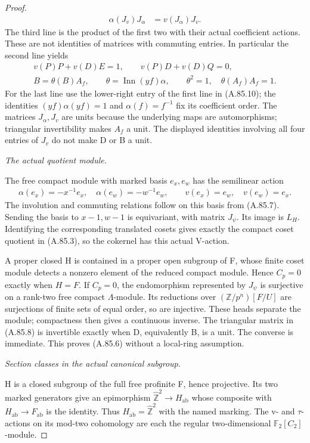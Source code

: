 \begin{proof}
\[\begin{aligned}
 \alpha(J_v)J_\alpha&=v(J_\alpha)J_v.
 \end{aligned}
 \tag{A.85.10}
\]
The third line is the product of the first two with their actual
coefficient actions. These are not identities of matrices with
commuting entries. In particular the second line yields
\[
 \begin{gathered}
 v(P)P+v(D)E=1,\qquad v(P)D+v(D)Q=0,\\
 B=\theta(B)A_f,\qquad
 \theta=\operatorname{Inn}(yf)\alpha,
 \qquad \theta^2=1,\quad\theta(A_f)A_f=1.
 \end{gathered}
 \tag{A.85.11}
\]
For the last line use the lower-right entry of the first line in
(A.85.10); the identities \((yf)\alpha(yf)=1\) and
\(\alpha(f)=f^{-1}\) fix its coefficient order. The matrices
\(J_\alpha,J_v\) are units because the underlying maps are
automorphisms; triangular invertibility makes \(A_f\) a unit.
The displayed identities involving all four entries of \(J_v\)
do not make D or B a unit.

\emph{The actual quotient module.}\par
The free compact module with marked basis \(e_x,e_w\) has the
semilinear action
\[
 \begin{gathered}
 \alpha(e_x)=-x^{-1}e_x,\quad
 \alpha(e_w)=-w^{-1}e_w,\qquad
 v(e_x)=e_w,\quad v(e_w)=e_x.
 \end{gathered}
\]
The involution and commuting relations follow on this basis from
(A.85.7). Sending the basis to \(x-1,w-1\) is equivariant, with
matrix \(J_\psi\). Its image is \(L_H\). Identifying the
corresponding translated cosets gives exactly the compact coset
quotient in (A.85.3), so the cokernel has this actual V-action.

A proper closed H is contained in a proper open subgroup of F, whose
finite coset module detects a nonzero element of the reduced compact
module. Hence \(C_p=0\) exactly when \(H=F\). If \(C_p=0\),
the endomorphism represented by \(J_\psi\) is surjective on a
rank-two free compact \(\Lambda\)-module. Its reductions over
\((\mathbb Z/p^n)[F/U]\) are surjections of finite sets of equal
order, so are injective. These heads separate the module; compactness
then gives a continuous inverse. The triangular matrix in (A.85.8)
is invertible exactly when D, equivalently B, is a unit. The converse
is immediate. This proves (A.85.6) without a local-ring assumption.

\emph{Section classes in the actual canonical subgroup.}\par
H is a closed subgroup of the full free profinite F, hence projective.
Its two marked generators give an epimorphism
\(\widehat{\mathbb Z}^2\to H_{\mathrm{ab}}\) whose composite
with \(H_{\mathrm{ab}}\to F_{\mathrm{ab}}\) is the identity.
Thus \(H_{\mathrm{ab}}=\widehat{\mathbb Z}^2\) with the named
marking. The v- and \(\tau\)-actions on its mod-two cohomology
are each the regular two-dimensional \(\mathbb F_2[C_2]\)-module.


\end{proof}
